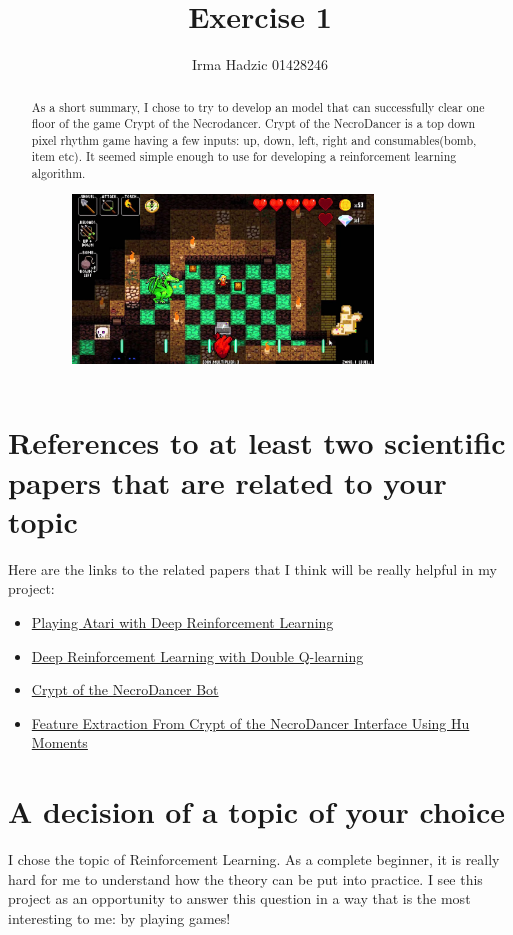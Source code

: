 \documentclass{article}
\title{Exercise 1}
\author{Irma Hadzic 01428246}
\begin{document}
\maketitle
\begin{abstract}
    As a short summary, I chose to try to develop an model that can successfully clear one floor of the game Crypt of the Necrodancer. Crypt of the NecroDancer is a top down pixel rhythm game having a few inputs: up, down, left, right and consumables(bomb, item etc). It seemed simple enough to use for developing a reinforcement learning algorithm.
    \begin{figure}[h]
    \includegraphics[width=8cm]{theCrypt.jpg}
    \centering
    \end{figure}
\end{abstract}

\section{References to at least two scientific papers that are related to your topic}
Here are the links to the related papers that I think will be really helpful in my project:
\begin{itemize}
    \item \href{https://paperswithcode.com/paper/playing-atari-with-deep-reinforcement}{Playing Atari with Deep Reinforcement Learning}
    \item \href{https://paperswithcode.com/paper/deep-reinforcement-learning-with-double-q}{Deep Reinforcement Learning with Double Q-learning}
    \item \href{https://bbukaty.github.io/CoNBot/report.pdf}{Crypt of the NecroDancer Bot}
    \item \href{https://informatika.stei.itb.ac.id/~rinaldi.munir/Citra/2019-2020/Makalah2019/13516002.pdf}{Feature Extraction From Crypt of the NecroDancer Interface
Using Hu Moments}
\end{itemize}

\section{A decision of a topic of your choice}
I chose the topic of Reinforcement Learning. As a complete beginner, it is really hard for me to understand how the theory can be put into practice. I see this project as an opportunity to answer this question in a way that is the most interesting to me: by playing games!
\end{document}
